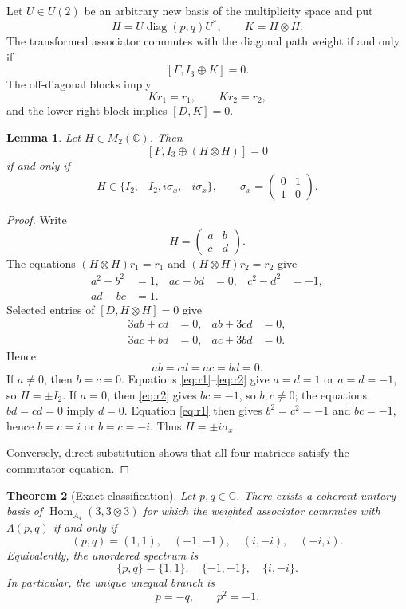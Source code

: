 \documentclass{article}
\newtheorem{theorem}{Theorem}
\newtheorem{lemma}[theorem]{Lemma}
\newcommand{\C}{\mathbb C}
\newcommand{\Hom}{\operatorname{Hom}}
\newcommand{\diag}{\operatorname{diag}}
\begin{document}
Let $U\in U(2)$ be an arbitrary new basis of the multiplicity space and put
\[
H=U\diag(p,q)U^*,
\qquad
K=H\otimes H.
\]
The transformed associator commutes with the diagonal path weight if and only
if
\[
\left[F,I_3\oplus K\right]=0.
\]
The off-diagonal blocks imply
\[
Kr_1=r_1,
\qquad
Kr_2=r_2,
\]
and the lower-right block implies $[D,K]=0$.

\begin{lemma}
Let $H\in M_2(\C)$. Then
\[
[ F,I_3\oplus(H\otimes H)]=0
\]
if and only if
\[
H\in\{I_2,-I_2,i\sigma_x,-i\sigma_x\},
\qquad
\sigma_x=\begin{pmatrix}0&1\\1&0\end{pmatrix}.
\]
\end{lemma}

\begin{proof}
Write
\[
H=\begin{pmatrix}a&b\\c&d\end{pmatrix}.
\]
The equations $(H\otimes H)r_1=r_1$ and
$(H\otimes H)r_2=r_2$ give
\begin{align}
a^2-b^2&=1, & ac-bd&=0, & c^2-d^2&=-1,
\label{eq:r1}\\
ad-bc&=1.\label{eq:r2}
\end{align}
Selected entries of $[D,H\otimes H]=0$ give
\begin{align*}
3ab+cd&=0,&ab+3cd&=0,\\
3ac+bd&=0,&ac+3bd&=0.
\end{align*}
Hence
\[
ab=cd=ac=bd=0.
\]
If $a\ne0$, then $b=c=0$. Equations
\eqref{eq:r1}--\eqref{eq:r2} give $a=d=1$ or $a=d=-1$, so
$H=\pm I_2$. If $a=0$, then \eqref{eq:r2} gives $bc=-1$, so
$b,c\ne0$; the equations $bd=cd=0$ imply $d=0$. Equation
\eqref{eq:r1} then gives $b^2=c^2=-1$ and $bc=-1$, hence
$b=c=i$ or $b=c=-i$. Thus $H=\pm i\sigma_x$.

Conversely, direct substitution shows that all four matrices satisfy the
commutator equation.
\end{proof}

\begin{theorem}[Exact classification]
Let $p,q\in\C$. There exists a coherent unitary basis of
$\Hom_{A_4}(3,3\otimes3)$ for which the weighted associator commutes with
$\Lambda(p,q)$ if and only if
\[
(p,q)=(1,1),\quad(-1,-1),\quad(i,-i),\quad(-i,i).
\]
Equivalently, the unordered spectrum is
\[
\{p,q\}=\{1,1\},\quad\{-1,-1\},\quad\{i,-i\}.
\]
In particular, the unique unequal branch is
\[
p=-q,\qquad p^2=-1.
\]
\end{theorem}
\end{document}
